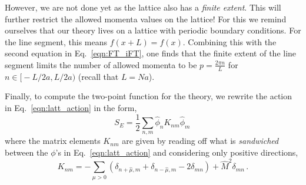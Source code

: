 \documentclass[11pt]{article}
\newcommand{\sidefact}[1]{\marginnote{\footnotesize\textcolor{green!50!black}{#1}}}
\theoremstyle{definition}
\begin{document}
However, we are not done yet as the lattice also has a \textit{finite extent}. This will further restrict the allowed momenta values on the lattice! For this we remind ourselves that our theory lives on a lattice with periodic boundary conditions. For the line segment, this means $f(x+L) = f(x)$. Combining this with the second equation in Eq.~\eqref{eqn:FT_iFT}, one finds that the finite extent of the line segment limits the number of allowed momenta to be $p = \frac{2 \pi n}{L}$ for $n \in \bigl[-L/2a , L/2a \bigr)$ (recall that $L=Na$)\sidefact{You will see a more detailed treatment of lattice momenta in Nico Dichter's treatment of fermions on the lattice on 24.06.}.
\noindent\makebox[\linewidth]{\dotfill}\par
\vspace{0.5\baselineskip}
Finally, to compute the two-point function for the theory, we rewrite the action in Eq.~\eqref{eqn:latt_action} in the form,
\begin{equation}\label{eqn:compact_lat_act}
S_E = \frac{1}{2} \displaystyle\sum_{n,m} \hat{\phi}_n K_{nm} \hat{\phi}_m  \,
\end{equation}
where the matrix elements $K_{nm}$ are given by reading off what is \textit{sandwiched} between the $\phi$'s in Eq.~\eqref{eqn:latt_action} and considering only positive directions, 
\begin{equation}\label{eqn:K_mat}
  K_{nm} = - \displaystyle\sum_{\mu>0} \left(\delta_{n+\hat{\mu},m} + \delta_{n-\hat{\mu},m} - 2 \delta_{mn} \right) + \hat{M}^2 \delta_{mn}\,.
\end{equation}
\end{document}
